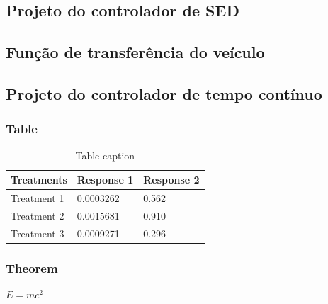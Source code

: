 


\subsection{Projeto do controlador de SED}



\subsection{Função de transferência do veículo}




\subsection{Projeto do controlador de tempo contínuo}

















\begin{frame}
\frametitle{Table}
\begin{table}
\begin{tabular}{l l l}
\toprule
\textbf{Treatments} & \textbf{Response 1} & \textbf{Response 2}\\
\midrule
Treatment 1 & 0.0003262 & 0.562 \\
Treatment 2 & 0.0015681 & 0.910 \\
Treatment 3 & 0.0009271 & 0.296 \\
\bottomrule
\end{tabular}
\caption{Table caption}
\end{table}
\end{frame}


\begin{frame}
\frametitle{Theorem}
\begin{theorem}
$E = mc^2$
\end{theorem}
\end{frame}


